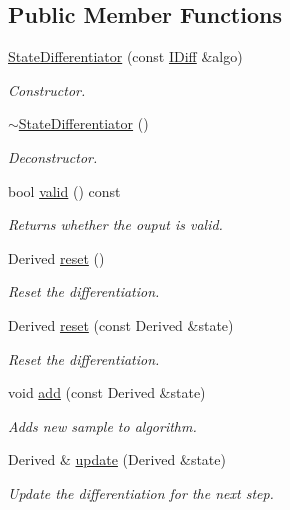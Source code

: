 \subsection*{Public Member Functions}
\begin{DoxyCompactItemize}
\item 
\hyperlink{classow__core_1_1StateDifferentiator_a6048852707de851d439e256a33f5b5ce}{State\+Differentiator} (const \hyperlink{classow__core_1_1IScalarDifferentiation}{I\+Diff} \&algo)\hypertarget{classow__core_1_1StateDifferentiator_a6048852707de851d439e256a33f5b5ce}{}\label{classow__core_1_1StateDifferentiator_a6048852707de851d439e256a33f5b5ce}

\begin{DoxyCompactList}\small\item\em Constructor. \end{DoxyCompactList}\item 
\hyperlink{classow__core_1_1StateDifferentiator_a0822aa59f5d75d187ba6dddecf6fe4f6}{$\sim$\+State\+Differentiator} ()\hypertarget{classow__core_1_1StateDifferentiator_a0822aa59f5d75d187ba6dddecf6fe4f6}{}\label{classow__core_1_1StateDifferentiator_a0822aa59f5d75d187ba6dddecf6fe4f6}

\begin{DoxyCompactList}\small\item\em Deconstructor. \end{DoxyCompactList}\item 
bool \hyperlink{classow__core_1_1StateDifferentiator_a4e4f03834a67723a04080d7348e26991}{valid} () const 
\begin{DoxyCompactList}\small\item\em Returns whether the ouput is valid. \end{DoxyCompactList}\item 
Derived \hyperlink{classow__core_1_1StateDifferentiator_a0c906b6d46092792d6477e587a1dba14}{reset} ()
\begin{DoxyCompactList}\small\item\em Reset the differentiation. \end{DoxyCompactList}\item 
Derived \hyperlink{classow__core_1_1StateDifferentiator_a6ff71184a001094e0b1a2ae961dec0dc}{reset} (const Derived \&state)
\begin{DoxyCompactList}\small\item\em Reset the differentiation. \end{DoxyCompactList}\item 
void \hyperlink{classow__core_1_1StateDifferentiator_a8988637f882760cd29de03134a474cdb}{add} (const Derived \&state)
\begin{DoxyCompactList}\small\item\em Adds new sample to algorithm. \end{DoxyCompactList}\item 
Derived \& \hyperlink{classow__core_1_1StateDifferentiator_ab6181e44eefa72fb262311ef17486321}{update} (Derived \&state)
\begin{DoxyCompactList}\small\item\em Update the differentiation for the next step. \end{DoxyCompactList}\end{DoxyCompactItemize}
